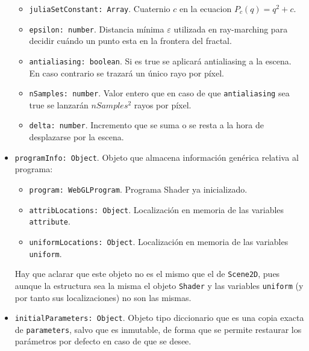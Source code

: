 \begin{itemize}
\begin{itemize}
        \item \verb|juliaSetConstant: Array|. Cuaternio $c$ en la ecuacion $P_c(q) = q^2 + c$.
        \item \verb|epsilon: number|. Distancia mínima $\varepsilon$ utilizada en ray-marching para decidir cuándo un punto esta en la frontera del fractal.
        \item \verb|antialiasing: boolean|. Si es true se aplicará antialiasing a la escena. En caso contrario se trazará un único rayo por píxel.
        \item \verb|nSamples: number|. Valor entero que en caso de que \verb|antialiasing| sea true se lanzarán $nSamples^2$ rayos por píxel.
        \item \verb|delta: number|. Incremento que se suma o se resta a la hora de desplazarse por la escena.
    \end{itemize}
    \item \verb|programInfo: Object|. Objeto que almacena información genérica relativa al programa:
    \begin{itemize}
        \item \verb|program: WebGLProgram|. Programa Shader ya inicializado.
        \item \verb|attribLocations: Object|. Localización en memoria de las variables \verb|attribute|.
        \item \verb|uniformLocations: Object|. Localización en memoria de las variables \verb|uniform|.
    \end{itemize}

    Hay que aclarar que este objeto no es el mismo que el de \verb|Scene2D|, pues aunque la estructura sea la misma el objeto \verb|Shader| y las variables \verb|uniform| (y por tanto sus localizaciones) no son las mismas.
    \item \verb|initialParameters: Object|. Objeto tipo diccionario que es una copia exacta de \verb|parameters|, salvo que es inmutable, de forma que se permite restaurar los parámetros por defecto en caso de que se desee.
\end{itemize}

